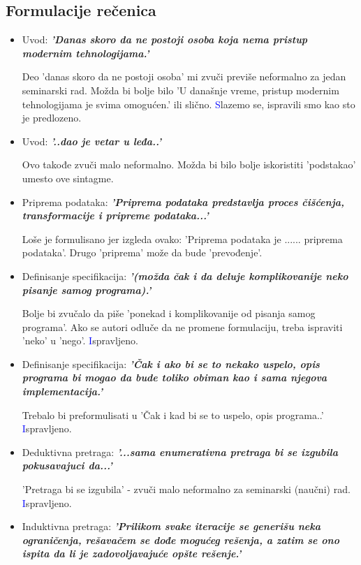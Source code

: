 \documentclass[a4paper]{report}
\newcommand{\odgovor}[1]{\textcolor{blue}{#1}}
\begin{document}
\subsection{Formulacije rečenica}
\begin{itemize}
	\item Uvod: \textbf{\textit{'Danas skoro da ne postoji osoba koja nema pristup modernim tehnologijama.'}}

		Deo 'danas skoro da ne postoji osoba' mi zvuči previše neformalno za jedan seminarski rad. Možda bi bolje bilo 'U današnje vreme, pristup modernim tehnologijama je svima omogućen.' ili slično.
		\odgovor Slazemo se, ispravili smo kao sto je predlozeno.

	\item Uvod: \textbf{\textit{'..dao je vetar u leđa..'}}

    Ovo takođe zvuči malo neformalno. Možda bi bilo bolje iskoristiti 'podstakao' umesto ove sintagme.

    \item Priprema podataka: \textbf{\textit{'Priprema podataka predstavlja proces čišćenja, transformacije i pripreme podataka...'}}

    Loše je formulisano jer izgleda ovako: 'Priprema podataka je ...... priprema podataka'. Drugo 'priprema' može da bude 'prevođenje'.

    \item Definisanje specifikacija: \textbf{\textit{'(možda čak i da deluje komplikovanije neko pisanje samog programa).'}}

    Bolje bi zvučalo da piše 'ponekad i komplikovanije od pisanja samog programa'. Ako se autori odluče da ne promene formulaciju, treba ispraviti 'neko' u 'nego'.
	\odgovor Ispravljeno.

    \item Definisanje specifikacija: \textbf{\textit{'Čak i ako bi se to nekako uspelo, opis programa bi mogao da bude toliko obiman kao i sama njegova implementacija.'}}

    Trebalo bi preformulisati u 'Čak i kad bi se to uspelo, opis programa..'
	\odgovor Ispravljeno.

    \item Deduktivna pretraga: \textbf{\textit{'...sama enumerativna pretraga bi se izgubila pokusavajuci da...'}}

    'Pretraga bi se izgubila' - zvuči malo neformalno za seminarski (naučni) rad.
	\odgovor Ispravljeno.

    \item Induktivna pretraga: \textbf{\textit{'Prilikom svake iteracije se generišu neka ograničenja, rešavačem se dođe mogućeg rešenja, a zatim se ono ispita da li je zadovoljavajuće opšte
rešenje.'}}


\end{itemize}
\end{document}
